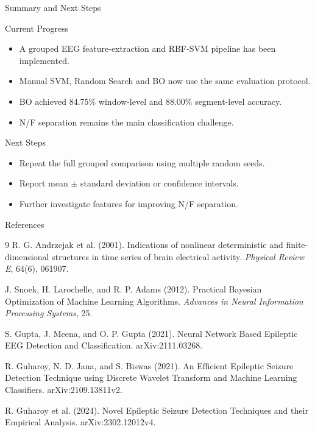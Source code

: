\documentclass{beamer}
\begin{document}
\begin{frame}{Summary and Next Steps}
  \begin{block}{Current Progress}
    \begin{itemize}
      \item A grouped EEG feature-extraction and RBF-SVM pipeline has been implemented.
      \item Manual SVM, Random Search and BO now use the same evaluation protocol.
      \item BO achieved 84.75\% window-level and 88.00\% segment-level accuracy.
      \item N/F separation remains the main classification challenge.
    \end{itemize}
  \end{block}

  \begin{block}{Next Steps}
    \begin{itemize}
      \item Repeat the full grouped comparison using multiple random seeds.
      \item Report mean $\pm$ standard deviation or confidence intervals.
      \item Further investigate features for improving N/F separation.
    \end{itemize}
  \end{block}
\end{frame}


\begin{frame}{References}
  \scriptsize
  \begin{thebibliography}{9}
    R. G. Andrzejak et al. (2001).
    \newblock Indications of nonlinear deterministic and finite-dimensional structures in time series of brain electrical activity.
    \newblock \emph{Physical Review E}, 64(6), 061907.

    J. Snoek, H. Larochelle, and R. P. Adams (2012).
    \newblock Practical Bayesian Optimization of Machine Learning Algorithms.
    \newblock \emph{Advances in Neural Information Processing Systems}, 25.

    S. Gupta, J. Meena, and O. P. Gupta (2021).
    \newblock Neural Network Based Epileptic EEG Detection and Classification.
    \newblock arXiv:2111.03268.

    R. Guharoy, N. D. Jana, and S. Biswas (2021).
    \newblock An Efficient Epileptic Seizure Detection Technique using Discrete Wavelet Transform and Machine Learning Classifiers.
    \newblock arXiv:2109.13811v2.

    R. Guharoy et al. (2024).
    \newblock Novel Epileptic Seizure Detection Techniques and their Empirical Analysis.
    \newblock arXiv:2302.12012v4.
  \end{thebibliography}
\end{frame}
\end{document}
